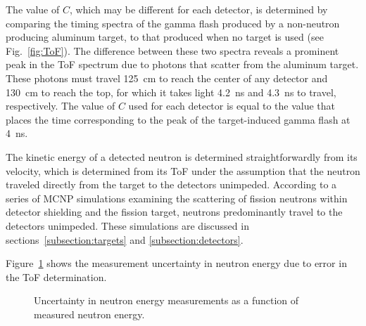 The value of $C$, which may be different for each detector, is determined by comparing the timing spectra of the gamma flash produced by a non-neutron producing aluminum target, to that produced when no target is used (see Fig.~\ref{fig:ToF}).
The difference between these two spectra reveals a prominent peak in the ToF spectrum due to photons that scatter from the aluminum target.
These photons must travel 125~cm to reach the center of any detector and 130~cm to reach the top, for which it takes light 4.2~ns and 4.3~ns to travel, respectively.
The value of $C$ used for each detector is equal to the value that places the time corresponding to the peak of the target-induced gamma flash at 4~ns.

The kinetic energy of a detected neutron is determined straightforwardly from its velocity, which is determined from its ToF under the assumption that the neutron traveled directly from the target to the detectors unimpeded.
According to a series of MCNP simulations examining the scattering of fission neutrons within detector shielding and the fission target, neutrons predominantly travel to the detectors unimpeded.
These simulations are discussed in sections~\ref{subsection:targets} and \ref{subsection:detectors}.

Figure~\ref{fig:ErgUncertainty} shows the measurement uncertainty in neutron energy due to error in the ToF determination.
\begin{figure}[]
    \caption{%
    Uncertainty in neutron energy measurements as a function of measured neutron energy.}
    \label{fig:ErgUncertainty}
\end{figure}
